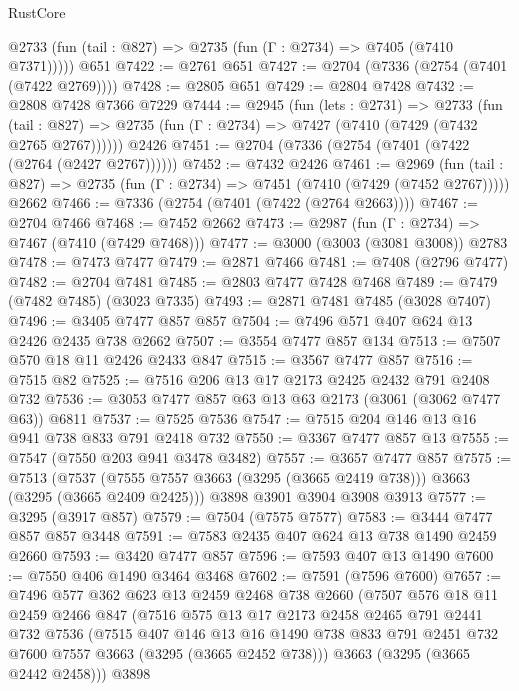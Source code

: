 \begin{lexlean}{RustCore}
\begin{coremodule}
      @2733 (fun (tail : @827) => @2735 (fun (Γ : @2734) => @7405 (@7410 @7371)))))
    @651
@7422 := @2761 @651
@7427 := @2704 (@7336 (@2754 (@7401 (@7422 @2769))))
@7428 := @2805 @651
@7429 := @2804 @7428
@7432 := @2808 @7428 @7366 @7229
@7444 := @2945
    (fun (lets : @2731) =>
    @2733
      (fun (tail : @827) => @2735 (fun (Γ : @2734) => @7427 (@7410 (@7429 (@7432 @2765 @2767))))))
    @2426
@7451 := @2704 (@7336 (@2754 (@7401 (@7422 (@2764 (@2427 @2767))))))
@7452 := @7432 @2426
@7461 := @2969
    (fun (tail : @827) => @2735 (fun (Γ : @2734) => @7451 (@7410 (@7429 (@7452 @2767)))))
    @2662
@7466 := @7336 (@2754 (@7401 (@7422 (@2764 @2663))))
@7467 := @2704 @7466
@7468 := @7452 @2662
@7473 := @2987 (fun (Γ : @2734) => @7467 (@7410 (@7429 @7468)))
@7477 := @3000 (@3003 (@3081 @3008)) @2783
@7478 := @7473 @7477
@7479 := @2871 @7466
@7481 := @7408 (@2796 @7477)
@7482 := @2704 @7481
@7485 := @2803 @7477 @7428 @7468
@7489 := @7479 (@7482 @7485) (@3023 @7335)
@7493 := @2871 @7481 @7485 (@3028 @7407)
@7496 := @3405 @7477 @857 @857
@7504 := @7496 @571 @407 @624 @13 @2426 @2435 @738 @2662
@7507 := @3554 @7477 @857 @134
@7513 := @7507 @570 @18 @11 @2426 @2433 @847
@7515 := @3567 @7477 @857
@7516 := @7515 @82
@7525 := @7516 @206 @13 @17 @2173 @2425 @2432 @791 @2408 @732
@7536 := @3053 @7477 @857 @63 @13 @63 @2173 (@3061 (@3062 @7477 @63)) @6811
@7537 := @7525 @7536
@7547 := @7515 @204 @146 @13 @16 @941 @738 @833 @791 @2418 @732
@7550 := @3367 @7477 @857 @13
@7555 := @7547 (@7550 @203 @941 @3478 @3482)
@7557 := @3657 @7477 @857
@7575 := @7513
    (@7537 (@7555 @7557 @3663 (@3295 (@3665 @2419 @738))) @3663 (@3295 (@3665 @2409 @2425)))
    @3898
    @3901
    @3904
    @3908
    @3913
@7577 := @3295 (@3917 @857)
@7579 := @7504 (@7575 @7577)
@7583 := @3444 @7477 @857 @857 @3448
@7591 := @7583 @2435 @407 @624 @13 @738 @1490 @2459 @2660
@7593 := @3420 @7477 @857
@7596 := @7593 @407 @13 @1490
@7600 := @7550 @406 @1490 @3464 @3468
@7602 := @7591 (@7596 @7600)
@7657 := @7496
    @577
    @362
    @623
    @13
    @2459
    @2468
    @738
    @2660
    (@7507
      @576
      @18
      @11
      @2459
      @2466
      @847
      (@7516
        @575
        @13
        @17
        @2173
        @2458
        @2465
        @791
        @2441
        @732
        @7536
        (@7515
          @407
          @146
          @13
          @16
          @1490
          @738
          @833
          @791
          @2451
          @732
          @7600
          @7557
          @3663
          (@3295 (@3665 @2452 @738)))
        @3663
        (@3295 (@3665 @2442 @2458)))
      @3898

\end{coremodule}
\end{lexlean}
